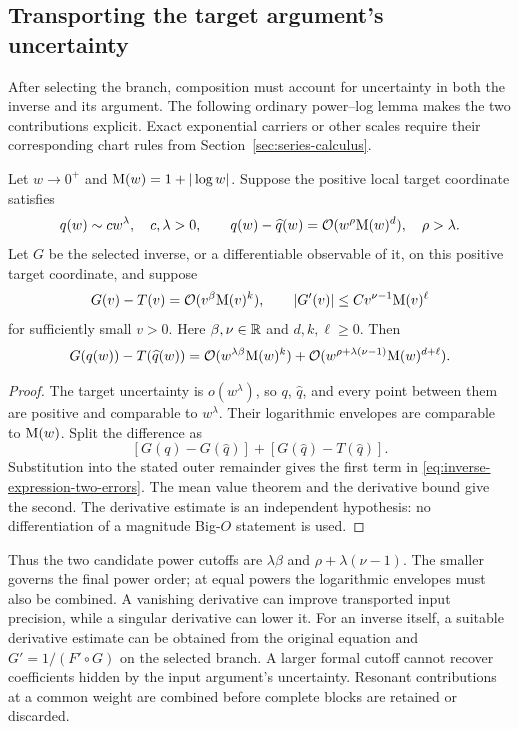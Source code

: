 \subsection{Transporting the target argument's uncertainty}

After selecting the branch, composition must account for uncertainty in
both the inverse and its argument. The following ordinary power--log
lemma makes the two contributions explicit. Exact exponential carriers
or other scales require their corresponding chart rules from
Section~\ref{sec:series-calculus}.

\begin{lemma}
\label{lem:inverse-expression-composition-error}
Let $w\to0^+$ and $\mathrm M(w)=1+|\log w|$. Suppose the positive local target
coordinate satisfies
\[
 q(w)\sim c w^\lambda,\quad c,\lambda>0,\qquad
 q(w)-\widehat q(w)=\mathcal O(w^\rho\mathrm M(w)^d),\quad \rho>\lambda.
\]
Let $G$ be the selected inverse, or a differentiable observable of it,
on this positive target coordinate, and suppose
\[
 G(v)-T(v)=\mathcal O(v^\beta\mathrm M(v)^k),\qquad
 |G'(v)|\le C v^{\nu-1}\mathrm M(v)^\ell
\]
for sufficiently small $v>0$. Here $\beta,\nu\in\mathbb R$ and
$d,k,\ell\ge0$. Then
\begin{equation}
 G(q(w))-T(\widehat q(w))
 =\mathcal O(w^{\lambda\beta}\mathrm M(w)^k)
  +\mathcal O(w^{\rho+\lambda(\nu-1)}\mathrm M(w)^{d+\ell}).
 \label{eq:inverse-expression-two-errors}
\end{equation}
\end{lemma}

\begin{proof}
The target uncertainty is $o(w^\lambda)$, so $q$, $\widehat q$, and
every point between them are positive and comparable to $w^\lambda$.
Their logarithmic envelopes are comparable to $\mathrm M(w)$. Split the
difference as
\[
 [G(q)-G(\widehat q)]+[G(\widehat q)-T(\widehat q)].
\]
Substitution into the stated outer remainder gives the first term in
\eqref{eq:inverse-expression-two-errors}. The mean value theorem and the
derivative bound give the second. The derivative estimate is an
independent hypothesis: no differentiation of a magnitude Big-$O$
statement is used.
\end{proof}

Thus the two candidate power cutoffs are $\lambda\beta$ and
$\rho+\lambda(\nu-1)$. The smaller governs the final power order;
at equal powers the logarithmic envelopes must also be combined.
A vanishing derivative can improve transported input precision, while
a singular derivative can lower it. For an inverse itself, a suitable
derivative estimate can be obtained from the original equation and
$G'=1/(F'\circ G)$ on the selected branch. A larger formal cutoff cannot recover coefficients hidden by the input
argument's uncertainty.
Resonant contributions at a common weight are combined before complete
blocks are retained or discarded.

